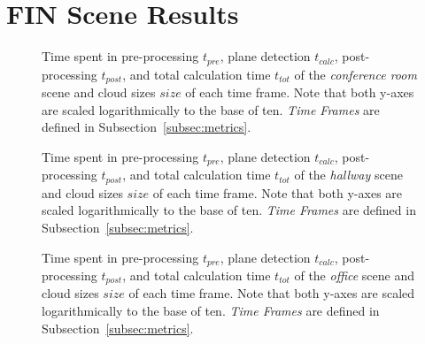 \documentclass[main.tex]{subfiles}
\begin{document}
\appendix
\chapter{FIN Scene Results}
\label{app:fin}

\begin{figure}[p]
    \centering
    \def\svgwidth{0.7\textwidth}
    
    \caption[Time Results Conference Room Scene]{Time spent in pre-processing $t_{pre}$, plane detection $t_{calc}$, post-processing
        $t_{post}$, and total calculation time $t_{tot}$ of the \textit{conference room} scene and cloud sizes $size$ of each time frame.
        Note that both y-axes are scaled logarithmically to the base of ten. \textit{Time Frames} are defined in Subsection~\ref{subsec:metrics}.}
    \label{fig:dynconf}
\end{figure}

\begin{figure}[H]
    \centering
    \def\svgwidth{0.7\textwidth}
    
    \caption[Time Results Hallway Scene]{Time spent in pre-processing $t_{pre}$, plane detection $t_{calc}$, post-processing
        $t_{post}$, and total calculation time $t_{tot}$ of the \textit{hallway} scene and cloud sizes $size$ of each time frame.
        Note that both y-axes are scaled logarithmically to the base of ten. \textit{Time Frames} are defined in Subsection~\ref{subsec:metrics}.}
    \label{fig:dynhallway}
\end{figure}

\begin{figure}[p]
    \centering
    \def\svgwidth{0.7\textwidth}
    
    \caption[Time Results Office Scene]{Time spent in pre-processing $t_{pre}$, plane detection $t_{calc}$, post-processing
        $t_{post}$, and total calculation time $t_{tot}$ of the \textit{office} scene and cloud sizes $size$ of each time frame.
        Note that both y-axes are scaled logarithmically to the base of ten. \textit{Time Frames} are defined in Subsection~\ref{subsec:metrics}.}
    \label{fig:dynoff}
\end{figure}
\end{document}
